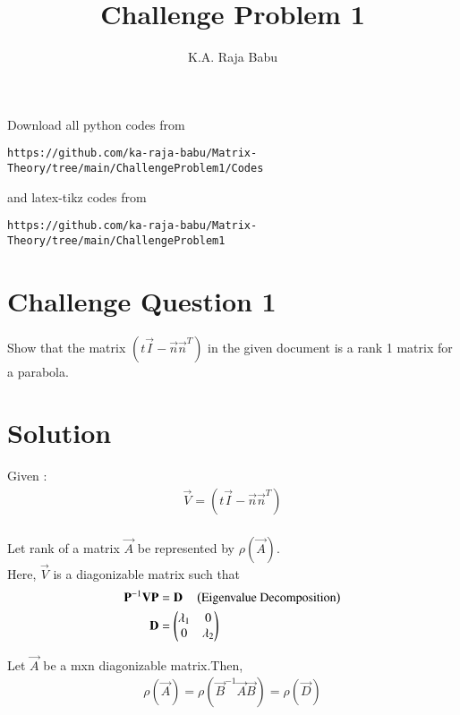 \documentclass[journal,12pt,twocolumn]{IEEEtran}
\begin{document}
     \def\rightbox#1{\makebox[0in][r]{#1}}
     \def\centbox#1{\makebox[0in]{#1}}
     \def\topbox#1{\raisebox{-\baselineskip}[0in][0in]{#1}}
     \def\midbox#1{\raisebox{-0.5\baselineskip}[0in][0in]{#1}}
\vspace{3cm}
\title{Challenge Problem 1}
\author{K.A. Raja Babu}
\maketitle
\newpage
\bigskip
\renewcommand{\thefigure}{\theenumi}
\renewcommand{\thetable}{\theenumi}
Download all python codes from 
\begin{lstlisting}
https://github.com/ka-raja-babu/Matrix-Theory/tree/main/ChallengeProblem1/Codes
\end{lstlisting}
%
and latex-tikz codes from 
%
\begin{lstlisting}
https://github.com/ka-raja-babu/Matrix-Theory/tree/main/ChallengeProblem1
\end{lstlisting}
%
\section{Challenge Question 1}
Show that the matrix $(t\vec{I}-\vec{n}\vec{n}^T)$ in the given document is a rank 1 matrix for a parabola.
%
\section{Solution}
Given :
\begin{align}
    \vec{V} = (t\vec{I}-\vec{n}\vec{n}^T) 
\end{align}
\\
Let rank of a matrix $\vec{A}$ be represented by $\rho(\vec{A})$.
\\
Here, $\vec{V}$ is a diagonizable matrix such that
\begin{align}
    \mathbf{P}^{-1}\mathbf{V}\mathbf{P} &= \mathbf{D}  \quad \left(\text{Eigenvalue Decomposition}\right)
    \\
    \mathbf{D} &= \begin{pmatrix}\lambda_1 & 0 \\ 0 & \lambda_2\end{pmatrix}
\end{align}

\begin{lemma}
Let $\vec{A}$ be a mxn diagonizable matrix.Then,
\begin{align}
   \rho(\vec{A}) = \rho(\vec{B}^{-1}\vec{A}\vec{B}) = \rho(\vec{D}) \label{eq1}
\end{align}
\end{lemma}
\end{document}
